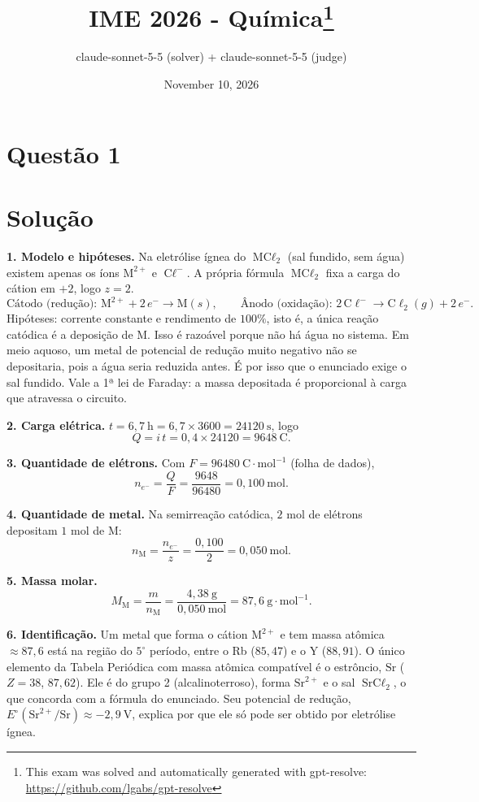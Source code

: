 \documentclass{article}%
\title{IME 2026 - Química\thanks{This exam was solved and automatically generated with gpt-resolve: \url{https://github.com/lgabs/gpt-resolve}}}%
\author{claude{-}sonnet{-}5{-}5 (solver) + claude{-}sonnet{-}5{-}5 (judge)}%
\date{November 10, 2026}%
\begin{document}
%
\normalsize%
\maketitle%
\section*{Questão 1}

\section*{Solução}

\textbf{1. Modelo e hipóteses.} Na eletrólise ígnea do $\text{MC}\ell_2$ (sal fundido, sem água) existem apenas os íons $\text{M}^{2+}$ e $\text{C}\ell^-$. A própria fórmula $\text{MC}\ell_2$ fixa a carga do cátion em $+2$, logo $z=2$.
\[
\text{Cátodo (redução): } \text{M}^{2+} + 2\,e^- \longrightarrow \text{M}(s), \qquad
\text{Ânodo (oxidação): } 2\,\text{C}\ell^- \longrightarrow \text{C}\ell_2(g) + 2\,e^-.
\]
Hipóteses: corrente constante e rendimento de $100\%$, isto é, a única reação catódica é a deposição de M. Isso é razoável porque não há água no sistema. Em meio aquoso, um metal de potencial de redução muito negativo não se depositaria, pois a água seria reduzida antes. É por isso que o enunciado exige o sal fundido. Vale a 1ª lei de Faraday: a massa depositada é proporcional à carga que atravessa o circuito.

\textbf{2. Carga elétrica.} $t = 6{,}7\ \text{h} = 6{,}7\times 3600 = 24120\ \text{s}$, logo
\[
Q = i\,t = 0{,}4\times 24120 = 9648\ \text{C}.
\]

\textbf{3. Quantidade de elétrons.} Com $F = 96480\ \text{C}\cdot\text{mol}^{-1}$ (folha de dados),
\[
n_{e^-} = \frac{Q}{F} = \frac{9648}{96480} = 0{,}100\ \text{mol}.
\]

\textbf{4. Quantidade de metal.} Na semirreação catódica, $2$ mol de elétrons depositam $1$ mol de M:
\[
n_\text{M} = \frac{n_{e^-}}{z} = \frac{0{,}100}{2} = 0{,}050\ \text{mol}.
\]

\textbf{5. Massa molar.}
\[
M_\text{M} = \frac{m}{n_\text{M}} = \frac{4{,}38\ \text{g}}{0{,}050\ \text{mol}} = 87{,}6\ \text{g}\cdot\text{mol}^{-1}.
\]

\textbf{6. Identificação.} Um metal que forma o cátion $\text{M}^{2+}$ e tem massa atômica $\approx 87{,}6$ está na região do $5^\circ$ período, entre o Rb ($85{,}47$) e o Y ($88{,}91$). O único elemento da Tabela Periódica com massa atômica compatível é o estrôncio, $\text{Sr}$ ($Z=38$, $87{,}62$). Ele é do grupo 2 (alcalinoterroso), forma $\text{Sr}^{2+}$ e o sal $\text{SrC}\ell_2$, o que concorda com a fórmula do enunciado. Seu potencial de redução, $E^\circ(\text{Sr}^{2+}/\text{Sr})\approx -2{,}9\ \text{V}$, explica por que ele só pode ser obtido por eletrólise ígnea.
\end{document}
